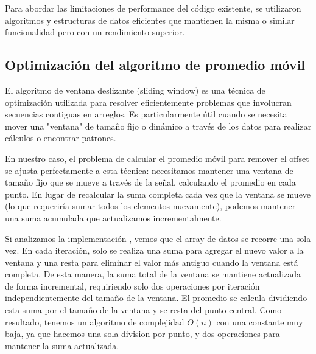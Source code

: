 \documentclass[12pt,a4paper]{article}
\begin{document}
Para abordar las limitaciones de performance del código existente, se utilizaron algoritmos y estructuras de datos eficientes que mantienen la misma o similar funcionalidad pero con un rendimiento superior.

\subsection{Optimización del algoritmo de promedio móvil}

El algoritmo de ventana deslizante (sliding window) es una técnica de optimización utilizada para resolver eficientemente problemas que involucran secuencias contiguas en arreglos. Es particularmente útil cuando se necesita mover una "ventana" de tamaño fijo o dinámico a través de los datos para realizar cálculos o encontrar patrones.

En nuestro caso, el problema de calcular el promedio móvil para remover el offset se ajusta perfectamente a esta técnica: necesitamos mantener una ventana de tamaño fijo que se mueve a través de la señal, calculando el promedio en cada punto. En lugar de recalcular la suma completa cada vez que la ventana se mueve (lo que requeriría sumar todos los elementos nuevamente), podemos mantener una suma acumulada que actualizamos incrementalmente.

Si analizamos la implementación , vemos que el array de datos se recorre una sola vez. En cada iteración, solo se realiza una suma para agregar el nuevo valor a la ventana y una resta para eliminar el valor más antiguo cuando la ventana está completa. De esta manera, la suma total de la ventana se mantiene actualizada de forma incremental, requiriendo solo dos operaciones por iteración independientemente del tamaño de la ventana. El promedio se calcula dividiendo esta suma por el tamaño de la ventana y se resta del punto central. Como resultado, tenemos un algoritmo de complejidad $O(n)$ con una constante muy baja, ya que hacemos una sola division por punto, y dos operaciones para mantener la suma actualizada.
\end{document}
